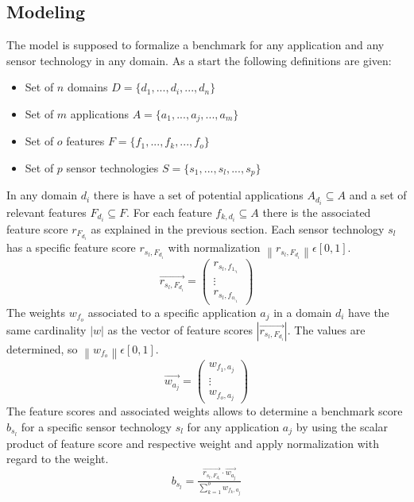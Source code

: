 \subsection{Modeling}
The model is supposed to formalize a benchmark for any application and any sensor technology in any domain. As a start the following definitions are given:
\begin{itemize}
\item Set of $n$ domains \(D=\{d_1,...,d_i,...,d_n\}\)
\item Set of $m$ applications \(A=\{a_1,...,a_j,...,a_m\}\)
\item Set of $o$ features \(F=\{f_1,...,f_k,...,f_o\}\)
\item Set of $p$ sensor technologies \(S=\{s_1,...,s_l,...,s_p\}\)
\end{itemize}
In any domain $d_i$ there is have a set of potential applications \(A_{d_{i}}\subseteq A\) and a set of relevant features \(F_{d_{i}}\subseteq F\). For each feature \(f_{k,d_{i}}\subseteq A\) there is the associated feature score \(r_{F_{d_i}}\) as explained in the previous section. Each sensor technology $s_l$ has a specific feature score \(r_{s_l,F_{d_i}}\) with normalization \(\left \| r_{s_l,F_{d_i}} \right \|\epsilon [0,1]\).
\begin{equation}
\overrightarrow{r_{s_l,F_{d_i}}}= \begin{pmatrix}
r_{s_l,f_{1,_i}}\\ 
\vdots\\
r_{s_l,f_{o,_i}}
\end{pmatrix}
\end{equation} 
The weights $w_{f_o}$ associated to a specific application $a_j$ in a domain $d_i$ have the same cardinality $\left | w \right |$ as the vector of feature scores $\left | \overrightarrow{r_{s_l,F_{d_i}}} \right |$. The values are determined, so \(\left \| w_{f_o} \right \|\epsilon [0,1]\).
\begin{equation}
\overrightarrow{w_{a_j}}=\begin{pmatrix}
w_{f_1,a_j}\\ 
\vdots\\
w_{f_o,a_j}
\end{pmatrix}
\end{equation}
The feature scores and associated weights allows to determine a benchmark score $b_{s_l}$ for a specific sensor technology $s_l$ for any application $a_j$ by using the scalar product of feature score and respective weight and apply normalization with regard to the weight.
\begin{equation}
b_{s_l}=\tfrac{\overrightarrow{r_{s_l,F_{d_i}}}\cdot \overrightarrow{w_{a_j}}}{\sum_{k=1}^{o}w_{f_k,a_j}}
\end{equation}
